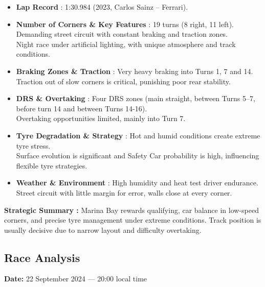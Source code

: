 \begin{itemize}
    \item \textbf{Lap Record} : 1:30.984 (2023, Carlos Sainz – Ferrari).
    
    \item \textbf{Number of Corners \& Key Features} : 19 turns (8 right, 11 left). \\
    Demanding street circuit with constant braking and traction zones. \\
    Night race under artificial lighting, with unique atmosphere and track conditions.
    
    \item \textbf{Braking Zones \& Traction} : Very heavy braking into Turns 1, 7 and 14. \\
    Traction out of slow corners is critical, punishing poor rear stability.
    
    \item \textbf{DRS \& Overtaking} : Four DRS zones (main straight, between Turns 5–7, before turn 14 and between Turns 14-16). \\
    Overtaking opportunities limited, mainly into Turn 7.
    
    \item \textbf{Tyre Degradation \& Strategy} : Hot and humid conditions create extreme tyre stress. \\
    Surface evolution is significant and Safety Car probability is high, influencing flexible tyre strategies.
    
    \item \textbf{Weather \& Environment} : High humidity and heat test driver endurance. \\
    Street circuit with little margin for error, walls close at every corner.
\end{itemize}

\textbf{Strategic Summary :} Marina Bay rewards qualifying, car balance in low-speed corners, and precise tyre management under extreme conditions. Track position is usually decisive due to narrow layout and difficulty overtaking.

\subsection{Race Analysis}

\textbf{Date:} 22 September 2024 — 20:00 local time 

